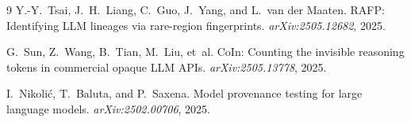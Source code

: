 \documentclass[10pt,twocolumn,letterpaper]{article}
\begin{document}
\begin{thebibliography}{9}
Y.-Y.~Tsai, J.~H.~Liang, C.~Guo, J.~Yang, and L.~van der Maaten.
\newblock RAFP: Identifying LLM lineages via rare-region fingerprints.
\newblock \emph{arXiv:2505.12682}, 2025.

G.~Sun, Z.~Wang, B.~Tian, M.~Liu, et~al.
\newblock CoIn: Counting the invisible reasoning tokens in commercial opaque LLM APIs.
\newblock \emph{arXiv:2505.13778}, 2025.

I.~Nikoli\'c, T.~Baluta, and P.~Saxena.
\newblock Model provenance testing for large language models.
\newblock \emph{arXiv:2502.00706}, 2025.

\end{thebibliography}
\end{document}
